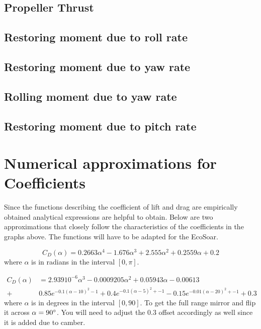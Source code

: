 \documentclass{article}
\begin{document}
\subsection{Propeller Thrust}


\subsection{Restoring moment due to roll rate}


\subsection{Restoring moment due to yaw rate}


\subsection{Rolling moment due to yaw rate}


\subsection{Restoring moment due to pitch rate}








\section{Numerical approximations for Coefficients}
Since the functions describing the coefficient of lift and drag are empirically obtained analytical expressions are helpful to obtain.
Below are two approximations that closely follow the characteristics of the coefficients in the graphs above.
The functions will have to be adapted for the EcoSoar.

\begin{equation}
C_D(\alpha) = 0.2663 \alpha^4 -1.676 \alpha^3 + 2.555 \alpha^2 + 0.2559 \alpha + 0.2%
\end{equation}
where $\alpha$ is in radians in the interval $[0,\pi]$.

\begin{equation}\begin{split}
    C_D(\alpha) &= 2.939 10^{-6} \alpha^3 -0.0009205 \alpha^2 + 0.05943 \alpha -0.00613 \\
    +&
    0.85 e^{ -0.1 (\alpha - 10)^2 - 1 } + 0.4 e^{ -0.1 (\alpha - 5)^2 + -1 } - 0.15 e^{ -0.01 (\alpha - 20)^2 + -1 }
    + 0.3
\end{split}\end{equation}
where $\alpha$ is in degrees in the interval $[0,90]$.
To get the full range mirror and flip it across $\alpha = 90 \degree$.
You will need to adjust the $0.3$ offset accordingly as well since it is added due to camber.
\end{document}

